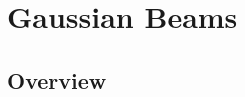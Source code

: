 \renewcommand{\lastmod}{September 18, 2023}
\renewcommand{\chapterauthors}{Markus Lippitz}

\chapter{Gaussian Beams }

\section{Overview}




\printbibliography[segment=\therefsegment,heading=subbibliography]
